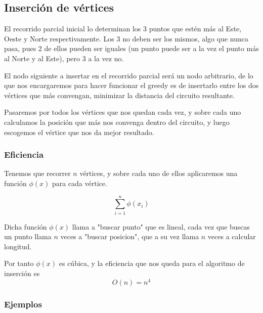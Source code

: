 \subsection{Inserción de vértices}
\begin{frame}
	\begin{block}{ }
El recorrido parcial inicial lo determinan los 3 puntos que estén más al Este, Oeste y Norte respectivamente. Los 3 no deben ser los mismos, algo que nunca pasa, pues 2 de ellos pueden ser iguales (un punto puede ser a la vez el punto más al Norte y al Este), pero 3 a la vez no.
	\end{block}

	\begin{block}{ }
	El nodo siguiente a insertar en el recorrido parcial será un nodo arbitrario, de lo 
	que nos encargaremos para hacer funcionar el greedy es de insertarlo entre los dos 
	vértices que más convengan, minimizar la distancia del circuito resultante.

	Pasaremos por todos los vértices que nos quedan cada vez, y sobre cada uno calculamos 
	la posición que más nos convenga dentro del circuito, y luego escogemos el vértice que 
	nos da mejor resultado.
	\end{block}
\end{frame}

\subsubsection{Eficiencia}
\begin{frame}
	\begin{block}
	Tenemos que recorrer $n$ vértices, y sobre cada uno de ellos aplicaremos una función 		
	$\phi(x)$ para cada vértice.

	\[ \sum_{i=1}^{n} \phi(x_i)\]
	\end{block}
	\begin{block}
	Dicha función $\phi(x)$ llama a "buscar punto" que es lineal, cada vez que buscas un 
	punto llama $n$ veces a "buscar posicion", que a su vez llama $n$ veces a calcular 
	longitud.

	Por tanto $\phi(x)$ es cúbica, y la eficiencia que nos queda para el algoritmo de 
	inserción es
	\[ O(n) = n^4 \]
	\end{block}
\end{frame}

\subsubsection{Ejemplos}

